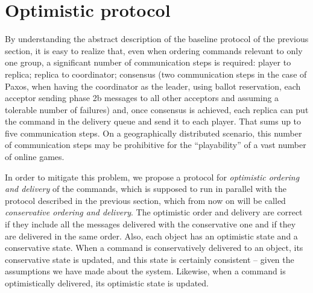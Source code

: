 \documentclass[times, 10pt]{article}
\begin{document}
%
%
%
%
%
%
%


\section{Optimistic protocol}

By understanding the abstract description of the baseline protocol of the previous section, it is easy to realize that, even when ordering commands relevant to only one group, a significant number of communication steps is required: player to replica; replica to coordinator; consensus (two communication steps in the case of Paxos, when having the coordinator as the leader, using ballot reservation, each acceptor sending phase 2b messages to all other acceptors and assuming a tolerable number of failures) and, once consensus is achieved, each replica can put the command in the delivery queue and send it to each player. That sums up to five communication steps. On a geographically distributed scenario, this number of communication steps may be prohibitive for the ``playability'' of a vast number of online games.

In order to mitigate this problem, we propose a protocol for \emph{optimistic ordering and delivery} of the commands, which is supposed to run in parallel with the protocol described in the previous section, which from now on will be called \emph{conservative ordering and delivery}. The optimistic order and delivery are correct if they include all the messages delivered with the conservative one and if they are delivered in the same order. Also, each object has an optimistic state and a conservative state. When a command is conservatively delivered to an object, its conservative state is updated, and this state is certainly consistent -- given the assumptions we have made about the system. Likewise, when a command is optimistically delivered, its optimistic state is updated.
\end{document}
